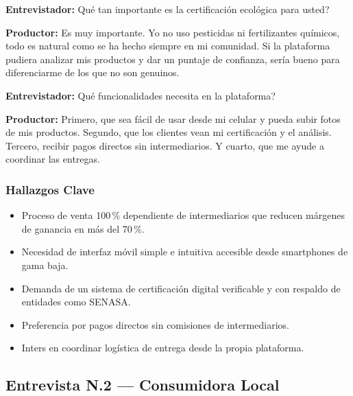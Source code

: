 \documentclass[12pt,a4paper]{article}
\begin{document}
\textbf{Entrevistador:} \textquestiondown Qu\'e tan importante es la certificaci\'on ecol\'ogica para usted?

\textbf{Productor:} Es muy importante. Yo no uso pesticidas ni fertilizantes qu\'imicos,
todo es natural como se ha hecho siempre en mi comunidad. Si la plataforma pudiera
analizar mis productos y dar un puntaje de confianza, ser\'ia bueno para
diferenciarme de los que no son genuinos.

\textbf{Entrevistador:} \textquestiondown Qu\'e funcionalidades necesita en la plataforma?

\textbf{Productor:} Primero, que sea f\'acil de usar desde mi celular y pueda subir fotos
de mis productos. Segundo, que los clientes vean mi certificaci\'on y el an\'alisis.
Tercero, recibir pagos directos sin intermediarios. Y cuarto, que me ayude a
coordinar las entregas.

\subsubsection{Hallazgos Clave}

\begin{itemize}[leftmargin=1.5cm]
  \item Proceso de venta 100\,\% dependiente de intermediarios que reducen m\'argenes
    de ganancia en m\'as del 70\,\%.
  \item Necesidad de interfaz m\'ovil simple e intuitiva accesible desde smartphones
    de gama baja.
  \item Demanda de un sistema de certificaci\'on digital verificable y con respaldo
    de entidades como SENASA.
  \item Preferencia por pagos directos sin comisiones de intermediarios.
  \item Inters en coordinar log\'istica de entrega desde la propia plataforma.
\end{itemize}

\subsection{Entrevista N.\textdegree{}2 --- Consumidora Local}
\end{document}
